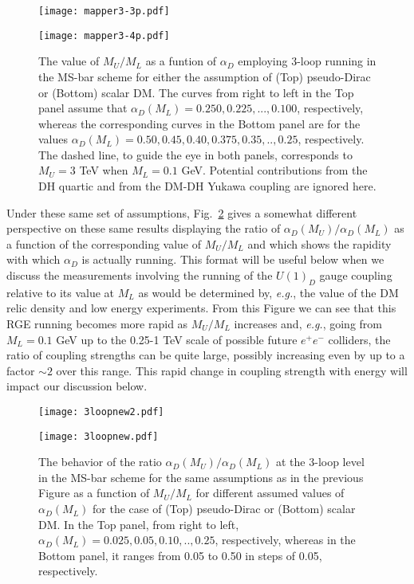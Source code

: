 \documentclass[14pt]{article}
\def\eg{{\it e.g.}}
\begin{document}
%
\begin{figure}[htbp]
\centerline{\texttt{[image: mapper3-3p.pdf]}}
\vspace*{-0.8cm}
\centerline{\texttt{[image: mapper3-4p.pdf]}}
\vspace*{-1.3cm}
\caption{The value of $M_U/M_L$ as a funtion of $\alpha_D$ employing 3-loop running in the MS-bar scheme for either the assumption of (Top) pseudo-Dirac or (Bottom) scalar DM. The curves 
from right to left in the Top panel assume that $\alpha_D(M_L)=0.250,0.225,...,0.100$, respectively, whereas the corresponding curves in the Bottom panel are for the values 
$\alpha_D(M_L)=0.50,0.45,0.40,0.375,0.35,..,0.25$, respectively. The dashed line, to guide the eye in both panels, corresponds to $M_U=3$ TeV when $M_L=0.1$ GeV. Potential contributions from 
the DH quartic and from the DM-DH Yukawa coupling are ignored here.}
\label{fig2}
\end{figure}
%

Under these same set of assumptions, Fig.~\ref{fig3} gives a somewhat different perspective on these same results displaying the ratio of $\alpha_D(M_U)/\alpha_D(M_L)$ as a function 
of the corresponding value of $M_U/M_L$ and which shows the rapidity with which $\alpha_D$ is actually running. This format will be useful below when we discuss the measurements involving  
the running of the $U(1)_D$ gauge coupling relative to its value at $M_L$ as would be determined by, \eg, the value of the DM relic density and low energy experiments. From this Figure 
we can see that this RGE running becomes more rapid as $M_U/M_L$ increases and, \eg, going from $M_L=0.1$ GeV up to the 0.25-1 TeV scale of possible future $e^+e^-$ colliders, the ratio of 
coupling strengths can be quite large, possibly increasing even by up to a factor $\sim 2$ over this range. This rapid change in coupling strength with energy will impact our discussion below.

%
\begin{figure}[htbp]
\centerline{\texttt{[image: 3loopnew2.pdf]}}
\vspace*{-0.8cm}
\centerline{\texttt{[image: 3loopnew.pdf]}}
\vspace*{-1.3cm}
\caption{The behavior of the ratio $\alpha_D(M_U)/\alpha_D(M_L)$ at the 3-loop level in the MS-bar scheme for the same assumptions as in the previous Figure as a function of $M_U/M_L$ for 
different assumed values of $\alpha_D(M_L)$ for 
the case of (Top) pseudo-Dirac or (Bottom) scalar DM. In the Top panel, from right to left, $\alpha_D(M_L)=0.025, 0.05,0.10,..,0.25$, respectively, whereas in the Bottom panel, it ranges from 
0.05 to 0.50 in steps of 0.05, respectively.}
\label{fig3}
\end{figure}
%
\end{document}
